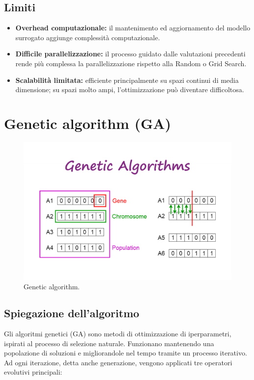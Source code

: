 \documentclass[a4paper,12pt]{report}
\begin{document}
	\subsection{Limiti}
	\begin{itemize}
		\item \textbf{Overhead computazionale:} il mantenimento ed aggiornamento del modello surrogato aggiunge complessità computazionale.
		\item \textbf{Difficile parallelizzazione:} il processo guidato dalle valutazioni precedenti rende più complessa la parallelizzazione rispetto alla Random o Grid Search.
		\item \textbf{Scalabilità limitata:} efficiente principalmente su spazi continui di media dimensione; su spazi molto ampi, l'ottimizzazione può diventare difficoltosa.
	\end{itemize}
	
	\section{Genetic algorithm (GA)}
	\begin{figure}[H]
		\centering
		\includegraphics[width=1.0\textwidth]{img/ga.png}
		\caption{Genetic algorithm.}
	\end{figure}
	\subsection{Spiegazione dell'algoritmo}
	Gli algoritmi genetici (GA) sono metodi di ottimizzazione di iperparametri, ispirati al processo di selezione naturale. Funzionano mantenendo una popolazione di soluzioni e migliorandole nel tempo tramite un processo iterativo. Ad ogni iterazione, detta anche generazione, vengono applicati tre operatori evolutivi principali:
	
\end{document}
